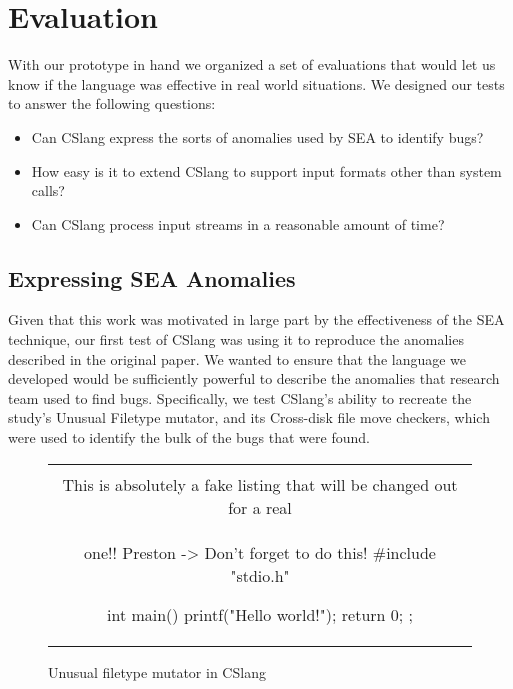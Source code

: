 \section{Evaluation}
\label{SEC:evaluation}

With our prototype in hand we organized a set of
evaluations that would let us know if the language was effective
in real world situations.
We designed our tests to answer the following questions:

\begin{itemize}

  \item{Can CSlang express the sorts of anomalies used by SEA to identify
    bugs?}

  \item{How easy is it to extend CSlang to support input formats other than
    system calls?}

  \item{Can CSlang process input streams in a reasonable amount of time?}

\end{itemize}


\subsection{Expressing SEA Anomalies}
\label{sub:SEAAnomalies}
Given that this work was motivated
in large part
by the effectiveness of the SEA technique,
our first test of CSlang was using it to reproduce the anomalies described
in the original paper.
We wanted to ensure that
the language we developed
would be sufficiently powerful
to describe the anomalies that
research team used to
find bugs.
Specifically, we test CSlang's ability to recreate
the study's Unusual Filetype mutator,
and its Cross-disk file move checkers, which were used to identify
the bulk of
the bugs that were found.

\begin{figure}[H]
\centering
\begin{tabular}{c}
\begin{lstlisting}
\\ This is absolutely a fake listing that will be changed out for a real
\\ one!!  Preston -> Don't forget to do this!
#include "stdio.h"

int main() {
    printf("Hello world!\n");
    return 0;
};
\end{lstlisting}
\end{tabular}
\caption{Unusual filetype mutator in CSlang}
\label{lst:UnusualFiletypeCSlang}
\end{figure}

